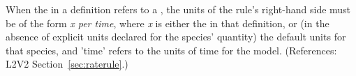 When the  in a \RateRule definition refers to a \Species,
the units of the rule's right-hand side must be of the form \emph{x per
time}, where \emph{x} is either the  in that \Species
definition, or (in the absence of explicit units declared for the species'
quantity) the default units for that species, and 'time' refers to the
units of time for the model.  (References: L2V2
Section~\ref{sec:raterule}.)
